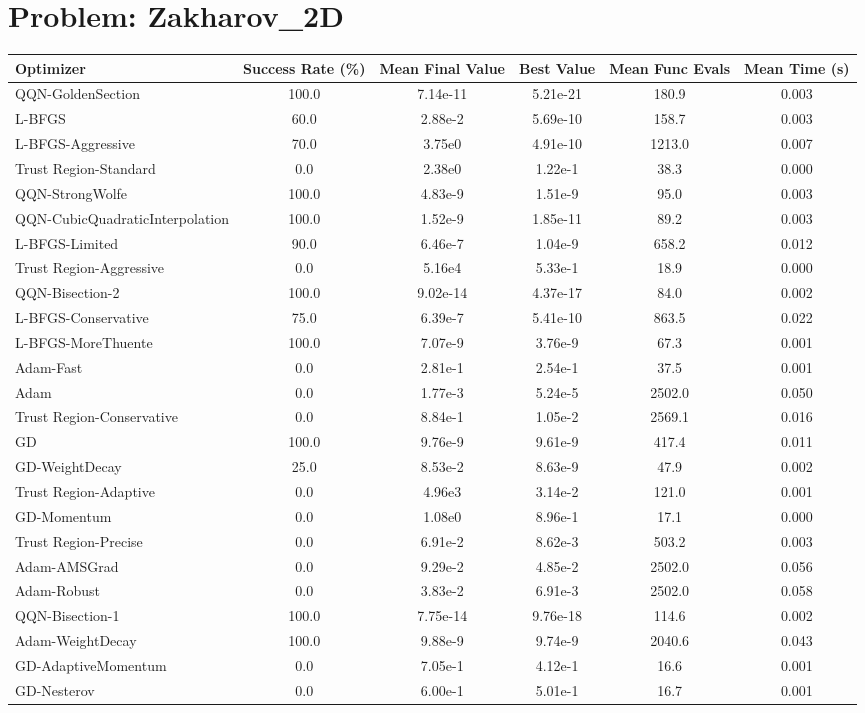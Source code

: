 \documentclass{article}
\begin{document}
\section{Problem: Zakharov\_2D}
\begin{longtable}{p{3cm}*{5}{c}}
\toprule
\textbf{Optimizer} & \textbf{Success Rate (\%)} & \textbf{Mean Final Value} & \textbf{Best Value} & \textbf{Mean Func Evals} & \textbf{Mean Time (s)} \\
\midrule
QQN-GoldenSection & 100.0 & 7.14e-11 & 5.21e-21 & 180.9 & 0.003 \\
L-BFGS & 60.0 & 2.88e-2 & 5.69e-10 & 158.7 & 0.003 \\
L-BFGS-Aggressive & 70.0 & 3.75e0 & 4.91e-10 & 1213.0 & 0.007 \\
Trust Region-Standard & 0.0 & 2.38e0 & 1.22e-1 & 38.3 & 0.000 \\
QQN-StrongWolfe & 100.0 & 4.83e-9 & 1.51e-9 & 95.0 & 0.003 \\
QQN-CubicQuadraticInterpolation & 100.0 & 1.52e-9 & 1.85e-11 & 89.2 & 0.003 \\
L-BFGS-Limited & 90.0 & 6.46e-7 & 1.04e-9 & 658.2 & 0.012 \\
Trust Region-Aggressive & 0.0 & 5.16e4 & 5.33e-1 & 18.9 & 0.000 \\
QQN-Bisection-2 & 100.0 & 9.02e-14 & 4.37e-17 & 84.0 & 0.002 \\
L-BFGS-Conservative & 75.0 & 6.39e-7 & 5.41e-10 & 863.5 & 0.022 \\
L-BFGS-MoreThuente & 100.0 & 7.07e-9 & 3.76e-9 & 67.3 & 0.001 \\
Adam-Fast & 0.0 & 2.81e-1 & 2.54e-1 & 37.5 & 0.001 \\
Adam & 0.0 & 1.77e-3 & 5.24e-5 & 2502.0 & 0.050 \\
Trust Region-Conservative & 0.0 & 8.84e-1 & 1.05e-2 & 2569.1 & 0.016 \\
GD & 100.0 & 9.76e-9 & 9.61e-9 & 417.4 & 0.011 \\
GD-WeightDecay & 25.0 & 8.53e-2 & 8.63e-9 & 47.9 & 0.002 \\
Trust Region-Adaptive & 0.0 & 4.96e3 & 3.14e-2 & 121.0 & 0.001 \\
GD-Momentum & 0.0 & 1.08e0 & 8.96e-1 & 17.1 & 0.000 \\
Trust Region-Precise & 0.0 & 6.91e-2 & 8.62e-3 & 503.2 & 0.003 \\
Adam-AMSGrad & 0.0 & 9.29e-2 & 4.85e-2 & 2502.0 & 0.056 \\
Adam-Robust & 0.0 & 3.83e-2 & 6.91e-3 & 2502.0 & 0.058 \\
QQN-Bisection-1 & 100.0 & 7.75e-14 & 9.76e-18 & 114.6 & 0.002 \\
Adam-WeightDecay & 100.0 & 9.88e-9 & 9.74e-9 & 2040.6 & 0.043 \\
GD-AdaptiveMomentum & 0.0 & 7.05e-1 & 4.12e-1 & 16.6 & 0.001 \\
GD-Nesterov & 0.0 & 6.00e-1 & 5.01e-1 & 16.7 & 0.001 \\
\bottomrule
\end{longtable}
\end{document}
